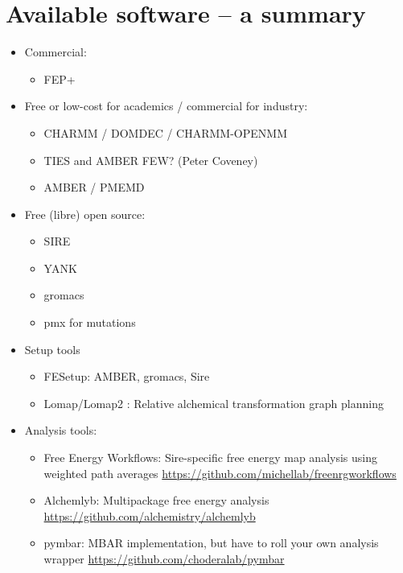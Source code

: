 \documentclass[9pt,bestpractices]{livecoms}
\begin{document}
\section{Available software -- a summary}
\label{sec:software}
\begin{itemize}
\item Commercial:
   \begin{itemize}
    \item FEP+
    \end{itemize}
\item Free or low-cost for academics / commercial for industry:
	\begin{itemize}
	\item CHARMM / DOMDEC / CHARMM-OPENMM
	\item TIES and AMBER FEW? (Peter Coveney)
	\item AMBER / PMEMD
	\end{itemize}
\item Free (libre) open source:
	\begin{itemize}
	\item SIRE
	\item YANK
	\item gromacs
	\item pmx for mutations
	\end{itemize}
\item Setup tools
	\begin{itemize}
	\item FESetup: AMBER, gromacs, Sire
	\item Lomap/Lomap2 : Relative alchemical transformation graph planning
	\end{itemize}
\item Analysis tools:
	\begin{itemize}
	\item Free Energy Workflows: Sire-specific free energy map analysis using weighted path averages
	\url{https://github.com/michellab/freenrgworkflows}
	\item Alchemlyb: Multipackage free energy analysis
	\url{https://github.com/alchemistry/alchemlyb}
	\item pymbar: MBAR implementation, but have to roll your own analysis wrapper
	\url{https://github.com/choderalab/pymbar}
	\end{itemize}
\end{itemize}
\end{document}
